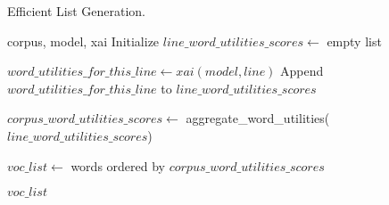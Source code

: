 \begin{algorithm}
\caption{Efficient List Generation.}
\label{alg:efficient-list-generation}
\begin{algorithmic}[1]
\Require corpus, model, xai
\State Initialize $line\_word\_utilities\_scores \gets$ empty list

    \State $word\_utilities\_for\_this\_line \gets xai(model, line)$
    \State Append $word\_utilities\_for\_this\_line$ to $line\_word\_utilities\_scores$
\EndFor

\State $corpus\_word\_utilities\_scores \gets$ aggregate\_word\_utilities($line\_word\_utilities\_scores$)

\State $voc\_list \gets$ words ordered by $corpus\_word\_utilities\_scores$

\State \Return $voc\_list$
\end{algorithmic}
\end{algorithm}
